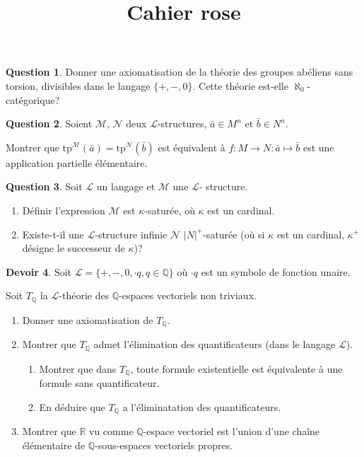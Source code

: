 \documentclass[12pt,a4paper]{exprog}
\title{Cahier rose}
\theoremstyle{definition} \newtheorem{thm}{Th\'{e}or\`{e}me}
\theoremstyle{definition} \newtheorem{quest}{Question}
\theoremstyle{definition} \newtheorem{dev}[quest]{Devoir}
\newcommand{\tp}[2]{\mathrm{tp}^{\mathcal{#1}}\left(#2\right)}
\begin{document}
\maketitle

\begin{quest}
  Donner une axiomatisation de la théorie des groupes abéliens
  sans torsion, divisibles dans le langage $\{+, -, 0\}$. Cette
  théorie est-elle $\aleph_0$-catégorique?
\end{quest}

\begin{quest}
  Soient $\mathcal M$, $\mathcal N$ deux $\mathcal L$-structures,
  $\bar{a}\in M^n$ et $\bar{b}\in N^n$.

  Montrer que $\tp{M}{\bar{a}} = \tp{N}{\bar{b}}$ est équivalent
  à $f: M\to N: \bar{a}\mapsto \bar{b}$ est une application
  partielle élémentaire.
\end{quest}

\begin{quest}
  Soit $\mathcal{L}$ un langage et $\mathcal{M}$ une $\mathcal L$-%
  structure.
  \begin{enumerate}
  \item Définir l'expression \og $\mathcal M$ est $\kappa$-saturée\fg{},
    où $\kappa$ est un cardinal.
  \item Existe-t-il une $\mathcal L$-structure infinie $\mathcal N$
    $|N|^+$-saturée (où si $\kappa$ est un cardinal, $\kappa^+$ désigne
    le successeur de $\kappa$)?

  \end{enumerate}
\end{quest}

\begin{dev}
  Soit $\mathcal L = \{ +, -, 0, \cdot q, q\in\mathbb Q\}$ où
  $\cdot q$ est un symbole de fonction unaire.

  Soit $T_{\mathbb Q}$ la $\mathcal L$-théorie des $\mathbb Q$-espaces
  vectoriels non triviaux.
  \begin{enumerate}
  \item Donner une axiomatisation de $T_{\mathbb Q}$.
  \item Montrer que $T_{\mathbb Q}$ admet l'élimination
    des quantificateurs (dans le langage $\mathcal L$).
    \begin{enumerate}
    \item Montrer que dans $T_{\mathbb Q}$, toute formule
      existentielle est équivalente à une formule sans quantificateur.
    \item En déduire que $T_{\mathbb Q}$ a l'éliminatation
      des quantificateurs.
    \end{enumerate}
  \item Montrer que $\mathbb R$ vu comme $\mathbb Q$-espace
    vectoriel est l'union d'une chaîne élémentaire de
    $\mathbb Q$-sous-espaces vectoriels propres.
  \end{enumerate}
\end{dev}
\end{document}
